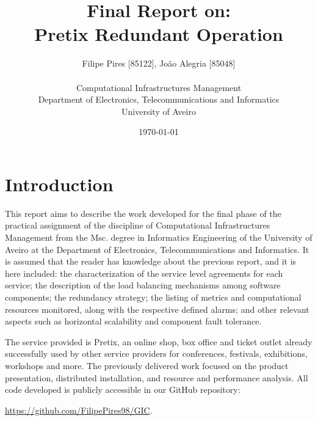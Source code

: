 \documentclass[12pt]{article}
\title{Final Report on:\\Pretix Redundant Operation}
\author
{Filipe Pires [85122], João Alegria [85048]\\
\\
Computational Infrastructures Management\\
\normalsize{Department of Electronics, Telecommunications and Informatics}\\
\normalsize{University of Aveiro}\\
}
\date{\today{}}
\begin{document}
 

\baselineskip18pt

\maketitle 

\section*{Introduction} \label{introduction} %

This report aims to describe the work developed for the final phase of the practical assignment of the discipline of Computational Infrastructures 
Management \cite{assign} from the Msc. degree in Informatics Engineering of the University of Aveiro at the Department of Electronics, Telecommunications and 
Informatics.
It is assumed that the reader has knowledge about the previous report, and it is here included:
the characterization of the service level agreements for each service;
the description of the load balancing mechanisms among software components;
the redundancy strategy;
the listing of metrics and computational resources monitored, along with the respective defined alarms;
and other relevant aspects such as horizontal scalability and component fault tolerance.

The service provided is Pretix, an online shop, box office and ticket outlet already successfully used by other service providers for conferences, festivals, 
exhibitions, workshops and more.
The previously delivered work focused on the product presentation, distributed installation, and resource and performance analysis.
All code developed is publicly accessible in our GitHub repository:

\url{https://github.com/FilipePires98/GIC}.



\end{document}
